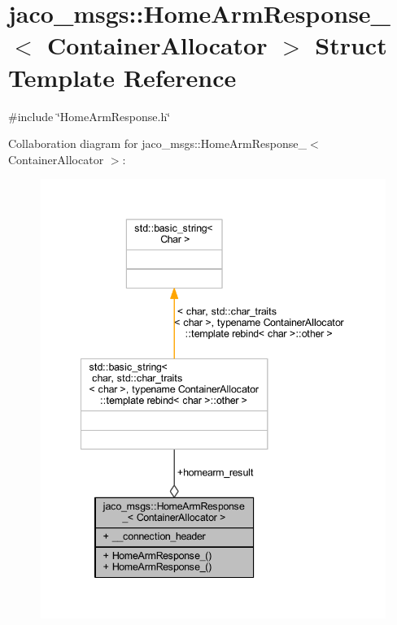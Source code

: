 \hypertarget{structjaco__msgs_1_1HomeArmResponse__}{}\section{jaco\+\_\+msgs\+:\+:Home\+Arm\+Response\+\_\+$<$ Container\+Allocator $>$ Struct Template Reference}
\label{structjaco__msgs_1_1HomeArmResponse__}


{\ttfamily \#include \char`\"{}Home\+Arm\+Response.\+h\char`\"{}}



Collaboration diagram for jaco\+\_\+msgs\+:\+:Home\+Arm\+Response\+\_\+$<$ Container\+Allocator $>$\+:
\nopagebreak
\begin{figure}[H]
\begin{center}
\leavevmode
\includegraphics[width=342pt]{dc/dc6/structjaco__msgs_1_1HomeArmResponse____coll__graph}
\end{center}
\end{figure}
